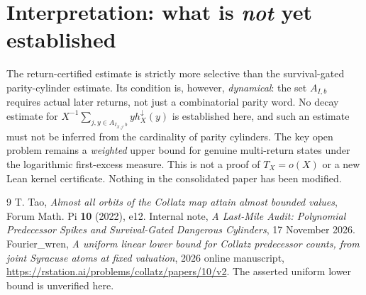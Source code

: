 \documentclass[11pt,a4paper]{article}
\begin{document}
\section{Interpretation: what is \emph{not} yet established}
The return-certified estimate is strictly more selective than the
survival-gated parity-cylinder estimate. Its condition is, however,
\emph{dynamical}: the set $A_{I,b}$ requires actual later returns,
not just a combinatorial parity word. No decay estimate for
$X^{-1}\sum_{j,y\in A_{I_{X,j},b}}y h_X^\downarrow(y)$ is established
here, and such an estimate must not be inferred from the cardinality
of parity cylinders. The key open problem remains a \emph{weighted}
upper bound for genuine multi-return states under the logarithmic
first-excess measure.  This is not a proof of $T_X=o(X)$ or a new
Lean kernel certificate. Nothing in the consolidated paper has been
modified.

\begin{thebibliography}{9}
T. Tao, \emph{Almost all orbits of the Collatz map attain almost
bounded values}, Forum Math. Pi \textbf{10} (2022), e12.
Internal note, \emph{A Last-Mile Audit: Polynomial Predecessor
Spikes and Survival-Gated Dangerous Cylinders}, 17 November 2026.
Fourier\_wren, \emph{A uniform linear lower bound for Collatz
predecessor counts, from joint Syracuse atoms at fixed valuation},
2026 online manuscript, \url{https://rstation.ai/problems/collatz/papers/10/v2}.
The asserted uniform lower bound is unverified here.
\end{thebibliography}
\end{document}
